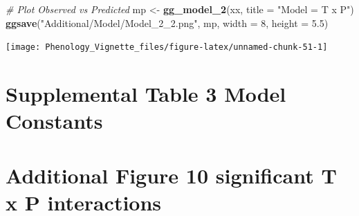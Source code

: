 \documentclass[
]{article}
\newenvironment{Shaded}{\begin{snugshade}}{\end{snugshade}}
\newcommand{\CommentTok}[1]{\textcolor[rgb]{0.56,0.35,0.01}{\textit{#1}}}
\newcommand{\DataTypeTok}[1]{\textcolor[rgb]{0.13,0.29,0.53}{#1}}
\newcommand{\DecValTok}[1]{\textcolor[rgb]{0.00,0.00,0.81}{#1}}
\newcommand{\FloatTok}[1]{\textcolor[rgb]{0.00,0.00,0.81}{#1}}
\newcommand{\KeywordTok}[1]{\textcolor[rgb]{0.13,0.29,0.53}{\textbf{#1}}}
\newcommand{\NormalTok}[1]{#1}
\newcommand{\OperatorTok}[1]{\textcolor[rgb]{0.81,0.36,0.00}{\textbf{#1}}}
\newcommand{\StringTok}[1]{\textcolor[rgb]{0.31,0.60,0.02}{#1}}
\begin{document}
\begin{Shaded}
\begin{Highlighting}[]
\CommentTok{# Plot Observed vs Predicted}
\NormalTok{mp <-}\StringTok{ }\KeywordTok{gg_model_2}\NormalTok{(xx, }\DataTypeTok{title =} \StringTok{"Model = T x P"}\NormalTok{)}
\KeywordTok{ggsave}\NormalTok{(}\StringTok{"Additional/Model/Model_2_2.png"}\NormalTok{, mp, }\DataTypeTok{width =} \DecValTok{8}\NormalTok{, }\DataTypeTok{height =} \FloatTok{5.5}\NormalTok{)}
\end{Highlighting}
\end{Shaded}

\texttt{[image: Phenology\_Vignette\_files/figure-latex/unnamed-chunk-51-1]}

\hypertarget{supplemental-table-3-model-constants}{%
\section{Supplemental Table 3 Model
Constants}\label{supplemental-table-3-model-constants}}

\begin{Shaded}
\end{Shaded}

\hypertarget{additional-figure-10-significant-t-x-p-interactions}{%
\section{Additional Figure 10 significant T x P
interactions}\label{additional-figure-10-significant-t-x-p-interactions}}
\end{document}
